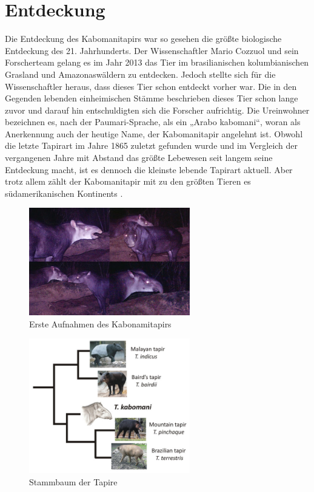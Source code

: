 \documentclass[12pt,a4paper,bibliography=totoc]{scrreprt}
\begin{document}
\section{Entdeckung}
Die Entdeckung des Kabomanitapirs war so gesehen die größte biologische Entdeckung des 21. Jahrhunderts. Der Wissenschaftler Mario Cozzuol und sein Forscherteam gelang es im Jahr 2013 das Tier im brasilianischen kolumbianischen Grasland und Amazonaswäldern zu entdecken. Jedoch stellte sich für die Wissenschaftler heraus, dass dieses Tier schon entdeckt vorher war. Die in den Gegenden lebenden einheimischen Stämme beschrieben dieses Tier schon lange zuvor und darauf hin entschuldigten sich die Forscher aufrichtig. Die Ureinwohner bezeichnen es, nach der Paumari-Sprache, als ein „Arabo kabomani“, woran als Anerkennung auch der heutige Name, der Kabomanitapir angelehnt ist. 
Obwohl die letzte Tapirart im Jahre 1865 zuletzt gefunden wurde und im Vergleich der vergangenen Jahre mit Abstand das größte Lebewesen seit langem seine Entdeckung macht, ist es dennoch die kleinste lebende Tapirart aktuell. Aber trotz allem zählt der Kabomanitapir mit zu den größten Tieren es südamerikanischen Kontinents \cite{5}. 

\begin{figure}[h]
\begin{center}
\includegraphics [width=7cm]{kabonami-tapier.jpg}
\caption[Erste Aufnahmen des Kabonamitapirs]{Erste Aufnahmen des Kabonamitapirs}
\label{EKtapir}
\end{center}
\end{figure} \FloatBarrier

\begin{figure}[h]
\begin{center}
\includegraphics [width=7cm]{Stammbaum.jpg}
\caption[Stammbaum der Tapire]{Stammbaum der Tapire}
\label{Stammtapir}
\end{center}
\end{figure} \FloatBarrier



\clearpage
\pagestyle{plain}

\end{document}
